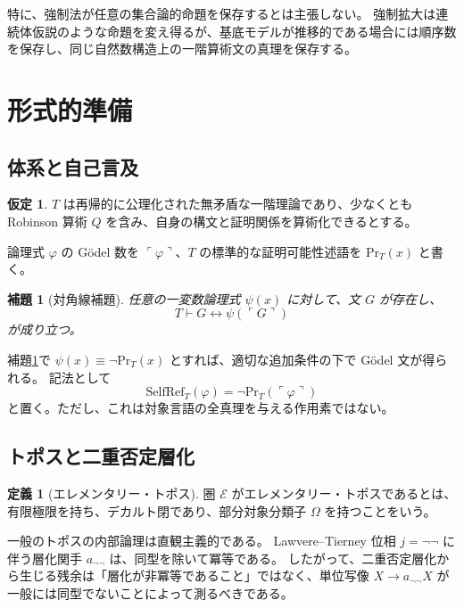 \documentclass[11pt]{ltjsarticle}
\theoremstyle{plain}
\newtheorem{lemma}[theorem]{補題}
\theoremstyle{definition}
\newtheorem{definition}[theorem]{定義}
\newtheorem{assumption}[theorem]{仮定}
\newcommand{\PrT}{\mathrm{Pr}_T}
\newcommand{\SelfRef}{\mathrm{SelfRef}}
\begin{document}
特に、強制法が任意の集合論的命題を保存するとは主張しない。
強制拡大は連続体仮説のような命題を変え得るが、基底モデルが推移的である場合には順序数を保存し、同じ自然数構造上の一階算術文の真理を保存する。

\section{形式的準備}
\label{sec:prelim}

\subsection{体系と自己言及}

\begin{assumption}\label{ass:T}
\(T\) は再帰的に公理化された無矛盾な一階理論であり、少なくとも Robinson 算術 \(Q\) を含み、自身の構文と証明関係を算術化できるとする。
\end{assumption}

論理式 \(\varphi\) の Gödel 数を \(\ulcorner\varphi\urcorner\)、\(T\) の標準的な証明可能性述語を \(\PrT(x)\) と書く。

\begin{lemma}[対角線補題]\label{lem:diagonal}
任意の一変数論理式 \(\psi(x)\) に対して、文 \(G\) が存在し、
\[
T\vdash G\leftrightarrow\psi(\ulcorner G\urcorner)
\]
が成り立つ。
\end{lemma}

補題\ref{lem:diagonal}で \(\psi(x)\equiv\neg\PrT(x)\) とすれば、適切な追加条件の下で Gödel 文が得られる\cite{kleene1952}。
記法として
\[
\SelfRef_T(\varphi)=\neg\PrT(\ulcorner\varphi\urcorner)
\]
と置く。ただし、これは対象言語の全真理を与える作用素ではない。

\subsection{トポスと二重否定層化}

\begin{definition}[エレメンタリー・トポス]
圏 \(\mathcal{E}\) がエレメンタリー・トポスであるとは、有限極限を持ち、デカルト閉であり、部分対象分類子 \(\Omega\) を持つことをいう。
\end{definition}

一般のトポスの内部論理は直観主義的である。
Lawvere--Tierney 位相 \(j=\neg\neg\) に伴う層化関手 \(a_{\neg\neg}\) は、同型を除いて冪等である\cite{johnstone2002}。
したがって、二重否定層化から生じる残余は「層化が非冪等であること」ではなく、単位写像
\(X\to a_{\neg\neg}X\) が一般には同型でないことによって測るべきである。
\end{document}
